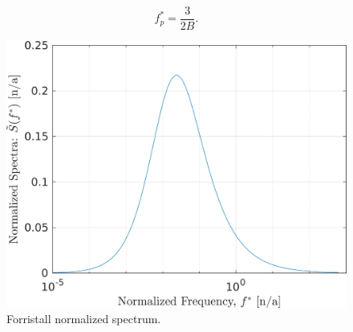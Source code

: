 \documentclass[utf8]{frontiersSCNS} %
\begin{document}
\begin{equation}
f^*_p = \frac{3}{2B}.
\end{equation}
\begin{figure}[h!]
  \centering
  \includegraphics[width=\SFc\textwidth]{forristall_norm.png}
  \caption{Forristall normalized spectrum.}
  \label{f:forristall_norm}
\end{figure}
\end{document}
